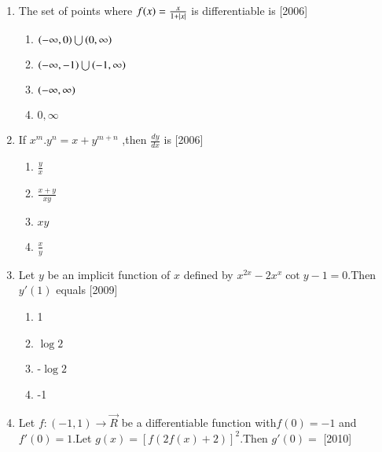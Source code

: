 \documentclass[journal,12pt,twocolumn]{IEEEtran}
\theoremstyle{remark}
\begin{document}
\begin{enumerate}
\begin{multicols}{4}
   
    \begin{enumerate}
    \item 24
    \item 36
    \item 12
    \item 18
    \end{enumerate}
     \end{multicols}
    \item The set of points where $f(x)=\frac{x}{1+\left\vert x\right\vert}$ is differentiable is \hfill[2006]\break
    \begin{multicols}{2}
    
    \begin{enumerate}
    \item $\left(-\infty,0\right)\bigcup\left(0,\infty\right)$
    \item $\left(-\infty,-1\right)\bigcup\left(-1,\infty\right)$
    \item $\left(-\infty,\infty\right)$
    \item ${0,\infty}$
    \end{enumerate}
    \end{multicols}
    \item If $x^m.y^n={x+y}^{m+n}$ ,then $\frac{dy}{dx}$ is \hfill[2006]\break
    \begin{multicols}{4}
        
  
    \begin{enumerate}
    \item $\frac{y}{x}$
    \item $\frac{x+y}{xy}$
    \item $xy$
    \item $\frac{x}{y}$
    \end{enumerate}
    \end{multicols}
    \item Let $y$ be an implicit function of $x$ defined by $x^{2x}-2x^x\cot{y}-1=0$.Then $y'(1)$ equals
    \hfill[2009]\break
    \begin{multicols}{4}
    \begin{enumerate}
    \item 1
    \item $\log2$
    \item -$\log2$
    \item -1
    \end{enumerate}
    \end{multicols}
    \item Let $f:(-1,1)\rightarrow\vec{R}$ be a differentiable function with$f(0)=-1$ and $f'(0)=1$.Let $g(x)=[f(2f(x)+2)]^2$.Then $g'(0)=$
	    \hfill[2010]
     \begin{multicols}{4}
         

\end{multicols}
\end{enumerate}
\end{document}
